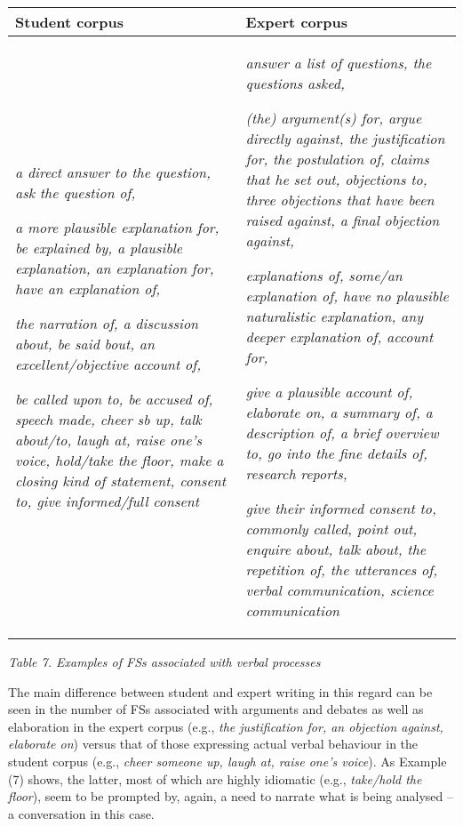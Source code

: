 \documentclass[12pt]{article}
\newenvironment{styleStandard}{\setlength\leftskip{0cm}\setlength\rightskip{0cm plus 1fil}\setlength\parindent{0cm}\setlength\parfillskip{0pt plus 1fil}\setlength\parskip{0cm plus 1pt}\writerlistparindent\writerlistleftskip\leavevmode\normalfont\normalsize\writerlistlabel\ignorespaces}{\unskip\vspace{0cm plus 1pt}\par}
\newcommand\writerlistleftskip{}
\newcommand\writerlistparindent{}
\newcommand\writerlistlabel{}
\begin{document}
\begin{center}
\tablefirsthead{}
\tablehead{}
\tabletail{}
\tablelasttail{}
\begin{supertabular}{m{2.25046in}m{2.31156in}}
\hline
Student corpus &
Expert corpus\\\hline
\textit{a direct answer to the question, ask the question of, }

\textit{a more plausible explanation for, be explained by, a plausible explanation, an explanation for, have an explanation of,}

\textit{the narration of, a discussion about, be said bout, an excellent/objective account of,}

\textit{be called upon to, be accused of, speech made, cheer sb up, talk about/to, laugh at, raise one’s voice, hold/take the floor, make a closing kind of statement, consent to, give informed/full consent} &
\textit{answer a list of questions, the questions asked, }

\textit{(the) argument(s) for, argue directly against, the justification for, the postulation of, claims that he set out, objections to, three objections that have been raised against, a final objection against, }

\textit{explanations of, some/an explanation of, have no plausible naturalistic explanation, any deeper explanation of, account for, }

\textit{give a plausible account of, elaborate on, a summary of, a description of, a brief overview to, go into the fine details of, research reports,}

\textit{give their informed consent to, commonly called, point out, enquire about, talk about, the repetition of, the utterances of, verbal communication, science communication}\\\hline
\end{supertabular}
\end{center}
\begin{styleStandard}
\textit{Table 7. Examples of FSs associated with verbal processes}
\end{styleStandard}

\begin{styleStandard}
The main difference between student and expert writing in this regard can be seen in the number of FSs associated with arguments and debates as well as elaboration in the expert corpus (e.g., \textit{the justification for, an objection against, elaborate on}) versus that of those expressing actual verbal behaviour in the student corpus (e.g., \textit{cheer someone up, laugh at, raise one’s voice}). As Example (7) shows, the latter, most of which are highly idiomatic (e.g., \textit{take/hold the floor}), seem to be prompted by, again, a need to narrate what is being analysed – a conversation in this case.
\end{styleStandard}
\end{document}
